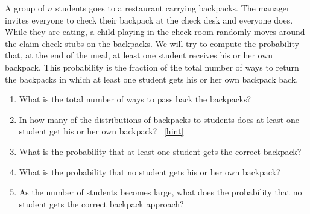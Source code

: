\documentclass{book}
\begin{document}
\setcounter{project}{222}
\addtocounter{project}{-1}
\begin{activity}[]\label{hatcheck}
\hypertarget{p-1235}{}%
A group of \(n\) students goes to a restaurant carrying backpacks. The manager invites everyone to check their backpack at the check desk and everyone does. While they are eating, a child playing in the check room randomly moves around the claim check stubs on the backpacks. We will try to compute the probability that, at the end of the meal, at least one student receives his or her own backpack.  This probability is the fraction of the total number of ways to return the backpacks in which at least one student gets his or her own backpack back.%
\begin{enumerate}[font=\bfseries,label=(\alph*),ref=\alph*]
\item\label{task-228} \hypertarget{p-1236}{}%
What is the total number of ways to pass back the backpacks?%
\item\label{task-229} \hypertarget{p-1238}{}%
In how many of the distributions of backpacks to students does at least one student get his or her own backpack?%
~\hfill{\tiny\hyperlink{a-222.b}{[hint]}\hypertarget{q-222.b}{}}\item\label{task-230} \hypertarget{p-1242}{}%
What is the probability that at least one student gets the correct backpack?%
\item\label{hatcheckprobpart} \hypertarget{p-1244}{}%
What is the probability that no student gets his or her own backpack?%
\item\label{task-232} \hypertarget{p-1246}{}%
As the number of students becomes large, what does the probability that no student gets the correct backpack approach?%
\end{enumerate}
\end{activity}
\end{document}
